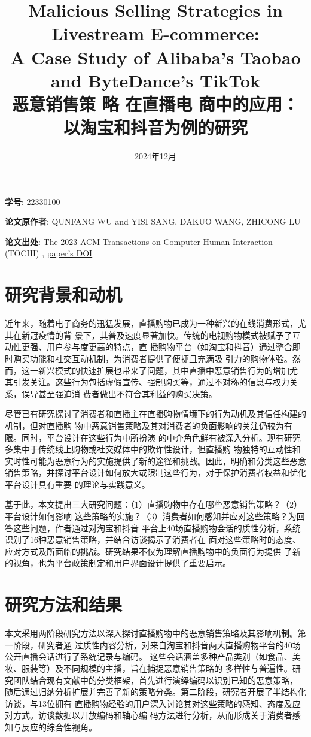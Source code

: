 \documentclass{article}
\title{Malicious Selling Strategies in Livestream E-commerce:
	\\A Case Study of Alibaba's Taobao and ByteDance's TikTok\\{\Large 恶意销售策
		略
		在直播电
		商中的应用：
		以淘宝和抖音为例的研究}}
\date{2024年12月}
\begin{document}
	
	\maketitle
	
	\textbf{学号}: 22330100
	
	\textbf{论文原作者}: QUNFANG WU and YISI SANG, 
	DAKUO WANG, 
	ZHICONG LU
	
	\textbf{论文出处}: The 2023 ACM Transactions on Computer-Human Interaction 
	(TOCHI) , \href{https://dl.acm.org/doi/10.1145/3577199}{paper's DOI}
	
	\section*{研究背景和动机}
近年来，随着电子商务的迅猛发展，直播购物已成为一种新兴的在线消费形式，尤其在新冠疫情的背
景下，其普及速度显著加快。传统的电视购物模式被赋予了互动性更强、用户参与度更高的特点，直
播购物平台（如淘宝和抖音）通过整合即时购买功能和社交互动机制，为消费者提供了便捷且充满吸
引力的购物体验。然而，这一新兴模式的快速扩展也带来了问题，其中直播中恶意销售行为的增加尤
其引发关注。这些行为包括虚假宣传、强制购买等，通过不对称的信息与权力关系，误导甚至强迫消
费者做出不符合其利益的购买决策。

尽管已有研究探讨了消费者和直播主在直播购物情境下的行为动机及其信任构建的机制，但对直播购
物中恶意销售策略及其对消费者的负面影响的关注仍较为有限。同时，平台设计在这些行为中所扮演
的中介角色鲜有被深入分析。现有研究多集中于传统线上购物或社交媒体中的欺诈性设计，但直播购
物独特的互动性和实时性可能为恶意行为的实施提供了新的途径和挑战。因此，明确和分类这些恶意
销售策略，并探讨平台设计如何放大或限制这些行为，对于保护消费者权益和优化平台设计具有重要
的理论与实践意义。

基于此，本文提出三大研究问题：（1）直播购物中存在哪些恶意销售策略？（2）平台设计如何影响
这些策略的实施？（3）消费者如何感知并应对这些策略？为回答这些问题，作者通过对淘宝和抖音
平台上40场直播购物会话的质性分析，系统识别了16种恶意销售策略，并结合访谈揭示了消费者在
面对这些策略时的态度、应对方式及所面临的挑战。研究结果不仅为理解直播购物中的负面行为提供
了新的视角，也为平台政策制定和用户界面设计提供了重要启示。
	
	\section*{研究方法和结果}
本文采用两阶段研究方法以深入探讨直播购物中的恶意销售策略及其影响机制。第一阶段，研究者通
过质性内容分析，对来自淘宝和抖音两大直播购物平台的40场公开直播会话进行了系统记录与编码。
这些会话涵盖多种产品类别（如食品、美妆、服装等）及不同规模的主播，旨在捕捉恶意销售策略的
多样性与普遍性。研究团队结合现有文献中的分类框架，首先进行演绎编码以识别已知的恶意策略，
随后通过归纳分析扩展并完善了新的策略分类。第二阶段，研究者开展了半结构化访谈，与13位拥有
直播购物经验的用户深入讨论其对这些策略的感知、态度及应对方式。访谈数据以开放编码和轴心编
码方法进行分析，从而形成关于消费者感知与反应的综合性视角。
\end{document}
